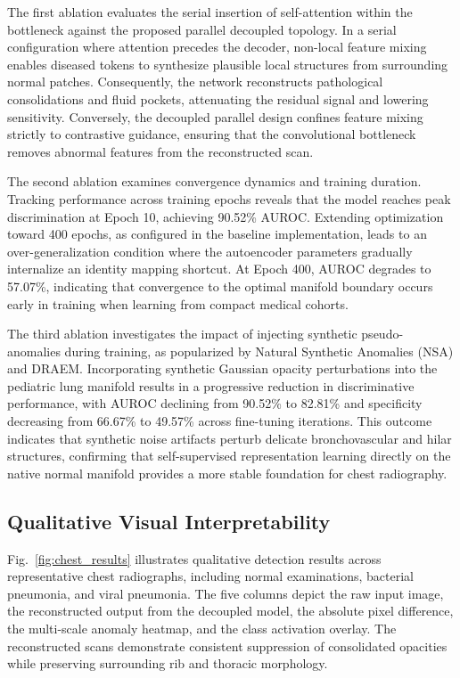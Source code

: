 \documentclass[journal]{IEEEtran}
\begin{document}
The first ablation evaluates the serial insertion of self-attention within the bottleneck against the proposed parallel decoupled topology. In a serial configuration where attention precedes the decoder, non-local feature mixing enables diseased tokens to synthesize plausible local structures from surrounding normal patches. Consequently, the network reconstructs pathological consolidations and fluid pockets, attenuating the residual signal and lowering sensitivity. Conversely, the decoupled parallel design confines feature mixing strictly to contrastive guidance, ensuring that the convolutional bottleneck removes abnormal features from the reconstructed scan.

The second ablation examines convergence dynamics and training duration. Tracking performance across training epochs reveals that the model reaches peak discrimination at Epoch 10, achieving 90.52\% AUROC. Extending optimization toward 400 epochs, as configured in the baseline implementation, leads to an over-generalization condition where the autoencoder parameters gradually internalize an identity mapping shortcut. At Epoch 400, AUROC degrades to 57.07\%, indicating that convergence to the optimal manifold boundary occurs early in training when learning from compact medical cohorts.

The third ablation investigates the impact of injecting synthetic pseudo-anomalies during training, as popularized by Natural Synthetic Anomalies (NSA) and DRAEM. Incorporating synthetic Gaussian opacity perturbations into the pediatric lung manifold results in a progressive reduction in discriminative performance, with AUROC declining from 90.52\% to 82.81\% and specificity decreasing from 66.67\% to 49.57\% across fine-tuning iterations. This outcome indicates that synthetic noise artifacts perturb delicate bronchovascular and hilar structures, confirming that self-supervised representation learning directly on the native normal manifold provides a more stable foundation for chest radiography.

\subsection{Qualitative Visual Interpretability}
Fig.~\ref{fig:chest_results} illustrates qualitative detection results across representative chest radiographs, including normal examinations, bacterial pneumonia, and viral pneumonia. The five columns depict the raw input image, the reconstructed output from the decoupled model, the absolute pixel difference, the multi-scale anomaly heatmap, and the class activation overlay. The reconstructed scans demonstrate consistent suppression of consolidated opacities while preserving surrounding rib and thoracic morphology.
\end{document}
